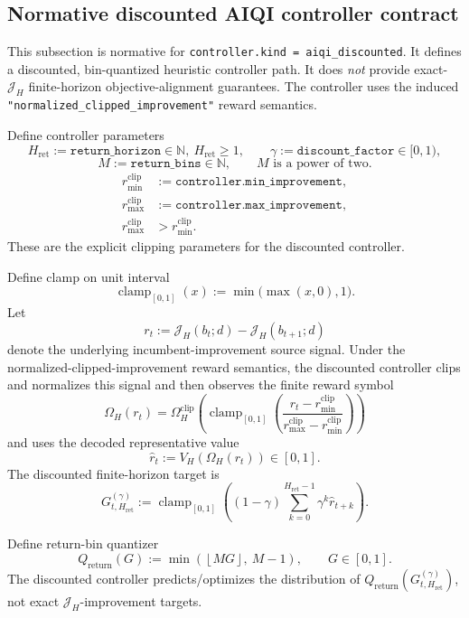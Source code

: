 \documentclass[11pt]{article}
\begin{document}
\subsection{Normative discounted AIQI controller contract}
\label{sec:aiqi-discounted-contract}

This subsection is normative for
\texttt{controller.kind = aiqi\_discounted}. It defines a
discounted, bin-quantized heuristic controller path. It does \emph{not}
provide exact-$\mathcal{J}_H$ finite-horizon objective-alignment guarantees.
The controller uses the induced
\texttt{"normalized\_clipped\_improvement"} reward semantics.

Define controller parameters
\[
H_{\mathrm{ret}}:=\texttt{return\_horizon}\in\mathbb{N},\ H_{\mathrm{ret}}\ge 1,
\qquad
\gamma:=\texttt{discount\_factor}\in[0,1),
\]
\[
M:=\texttt{return\_bins}\in\mathbb{N},
\qquad
M\text{ is a power of two}.
\]
\[
\begin{aligned}
r_{\min}^{\mathrm{clip}}&:=\texttt{controller.min\_improvement},\\
r_{\max}^{\mathrm{clip}}&:=\texttt{controller.max\_improvement},\\
r_{\max}^{\mathrm{clip}}&>r_{\min}^{\mathrm{clip}}.
\end{aligned}
\]
These are the explicit clipping parameters for the discounted controller.

Define clamp on unit interval
\[
\operatorname{clamp}_{[0,1]}(x):=\min\!\bigl(\max(x,0),1\bigr).
\]
Let
\[
r_t:=\mathcal{J}_H(b_t;d)-\mathcal{J}_H(b_{t+1};d)
\]
denote the underlying incumbent-improvement source signal. Under the
normalized-clipped-improvement reward semantics, the discounted controller
clips and normalizes this signal and then observes the finite reward symbol
\[
\Omega_H(r_t)
=
\Omega_H^{\mathrm{clip}}
\left(
\operatorname{clamp}_{[0,1]}
\left(
\frac{r_t-r_{\min}^{\mathrm{clip}}}{r_{\max}^{\mathrm{clip}}-r_{\min}^{\mathrm{clip}}}
\right)
\right)
\]
and uses the decoded representative value
\[
\hat r_t:=V_H(\Omega_H(r_t))\in[0,1].
\]
The discounted finite-horizon target is
\[
G_{t,H_{\mathrm{ret}}}^{(\gamma)}:=
\operatorname{clamp}_{[0,1]}\!\left(
(1-\gamma)\sum_{k=0}^{H_{\mathrm{ret}}-1}\gamma^k\hat r_{t+k}
\right).
\]

Define return-bin quantizer
\[
Q_{\mathrm{return}}(G):=
\min\!\left(\left\lfloor M G\right\rfloor,\ M-1\right),
\qquad
G\in[0,1].
\]
The discounted controller predicts/optimizes the distribution of
$Q_{\mathrm{return}}(G_{t,H_{\mathrm{ret}}}^{(\gamma)})$, not exact
$\mathcal{J}_H$-improvement targets.
\end{document}
